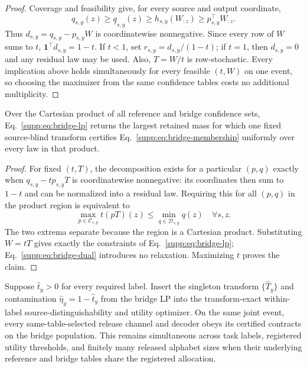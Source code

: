 \begin{proof}
Coverage and feasibility give, for every source and output coordinate,
\begin{equation}
 q_{s,y}(z)\geq\underline q_{s,y}(z)
 \geq h_{s,y}(W_{:z})\geq p_{s,y}^{\top}W_{:z}.
\end{equation}
Thus $d_{s,y}=q_{s,y}-p_{s,y}W$ is coordinatewise nonnegative. Since every row
of $W$ sums to $t$, $\mathbf1^\top d_{s,y}=1-t$. If $t<1$, set
$r_{s,y}=d_{s,y}/(1-t)$; if $t=1$, then $d_{s,y}=0$ and any residual law may be
used. Also, $T=W/t$ is row-stochastic. Every implication above holds
simultaneously for every feasible $(t,W)$ on one event, so choosing the
maximizer from the same confidence tables costs no additional multiplicity.
\end{proof}

\begin{proposition}
Over the Cartesian product of all reference and bridge confidence sets,
Eq.~\eqref{supp:eq:bridge-lp} returns the largest retained mass for which one
fixed source-blind transform certifies Eq.~\eqref{supp:eq:bridge-membership}
uniformly over every law in that product.
\end{proposition}

\begin{proof}
For fixed $(t,T)$, the decomposition exists for a particular $(p,q)$ exactly
when $q_{s,y}-tp_{s,y}T$ is coordinatewise nonnegative: its coordinates then
sum to $1-t$ and can be normalized into a residual law. Requiring this for all
$(p,q)$ in the product region is equivalent to
\begin{equation}
 \max_{p\in\mathcal C_{s,y}}t(pT)(z)
 \leq\min_{q\in\mathcal D_{s,y}}q(z)\quad\forall s,z.
\end{equation}
The two extrema separate because the region is a Cartesian product.
Substituting $W=tT$ gives exactly the constraints of
Eq.~\eqref{supp:eq:bridge-lp}; Eq.~\eqref{supp:eq:bridge-dual} introduces no
relaxation. Maximizing $t$ proves the claim.
\end{proof}

\begin{corollary}
Suppose $\widehat t_y>0$ for every required label. Insert the singleton
transform $\{\widehat T_y\}$ and contamination
$\widehat\eta_y=1-\widehat t_y$ from the bridge LP into the transform-exact
within-label source-distinguishability and utility optimizer. On the same joint event, every
same-table-selected release channel and decoder obeys its certified contracts
on the bridge population. This remains simultaneous across task labels,
registered utility thresholds, and finitely many released alphabet sizes when
their underlying reference and bridge tables share the registered allocation.
\end{corollary}


